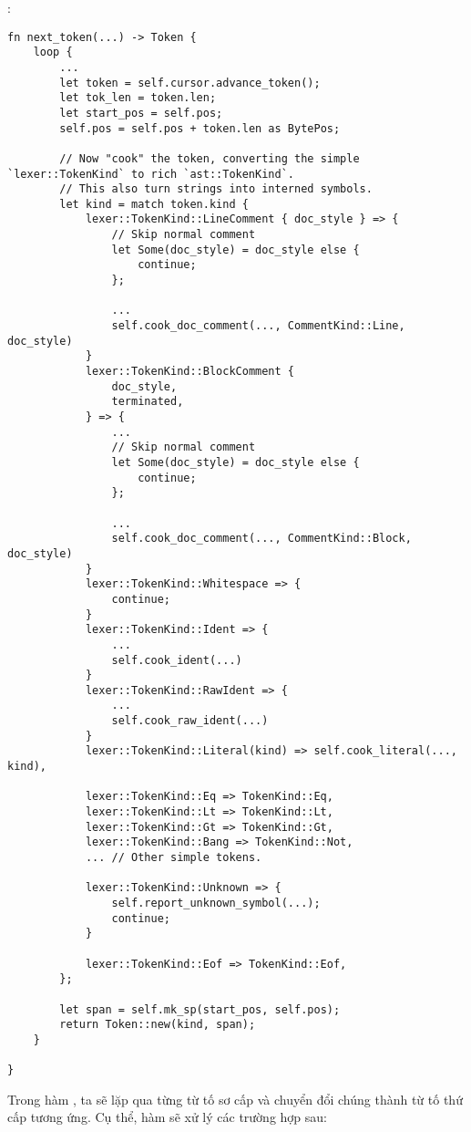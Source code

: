 \noindent {}:
\begin{lstlisting}[]
fn next_token(...) -> Token {
    loop {
        ...
        let token = self.cursor.advance_token();
        let tok_len = token.len;
        let start_pos = self.pos;
        self.pos = self.pos + token.len as BytePos;

        // Now "cook" the token, converting the simple `lexer::TokenKind` to rich `ast::TokenKind`.
        // This also turn strings into interned symbols.
        let kind = match token.kind {
            lexer::TokenKind::LineComment { doc_style } => {
                // Skip normal comment
                let Some(doc_style) = doc_style else {
                    continue;
                };

                ...
                self.cook_doc_comment(..., CommentKind::Line, doc_style)
            }
            lexer::TokenKind::BlockComment {
                doc_style,
                terminated,
            } => {
                ...
                // Skip normal comment
                let Some(doc_style) = doc_style else {
                    continue;
                };

                ...
                self.cook_doc_comment(..., CommentKind::Block, doc_style)
            }
            lexer::TokenKind::Whitespace => {
                continue;
            }
            lexer::TokenKind::Ident => {
                ...
                self.cook_ident(...)
            }
            lexer::TokenKind::RawIdent => {
                ...
                self.cook_raw_ident(...)
            }
            lexer::TokenKind::Literal(kind) => self.cook_literal(..., kind),

            lexer::TokenKind::Eq => TokenKind::Eq,
            lexer::TokenKind::Lt => TokenKind::Lt,
            lexer::TokenKind::Gt => TokenKind::Gt,
            lexer::TokenKind::Bang => TokenKind::Not,
            ... // Other simple tokens.

            lexer::TokenKind::Unknown => {
                self.report_unknown_symbol(...);
                continue;
            }

            lexer::TokenKind::Eof => TokenKind::Eof,
        };

        let span = self.mk_sp(start_pos, self.pos);
        return Token::new(kind, span);
    }

}
\end{lstlisting}

    Trong hàm , ta sẽ lặp qua từng từ tố sơ cấp và chuyển đổi chúng thành từ tố thứ cấp tương ứng. Cụ thể, hàm sẽ xử lý các trường hợp sau:

